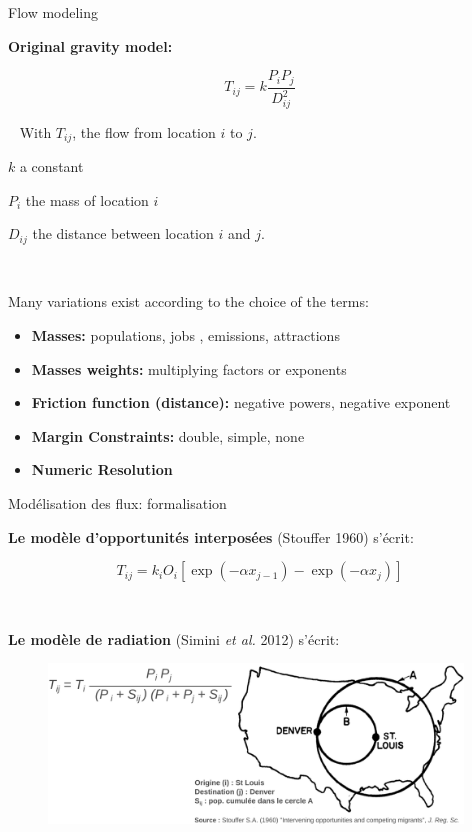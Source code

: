\begin{frame}{Flow modeling}

\textbf{Original gravity model:}

\begin{equation}
\nonumber
T_{ij} = k \frac{P_i P_j}{D_{ij}^{2}}
\end{equation}

~
With $T_{ij}$, the flow from location $i$ to $j$.

$k$ a constant

$P_i$ the mass of location $i$

$D_{ij}$ the distance between location $i$ and $j$.


~

Many variations exist according to the choice of the terms:

\begin{itemize}
  \item \textbf{Masses:} populations, jobs , emissions, attractions
  \item \textbf{Masses weights:} multiplying factors or exponents
  \item \textbf{Friction function (distance):} negative powers, negative exponent
  \item \textbf{Margin Constraints:} double, simple, none
  \item \textbf{Numeric Resolution } 
\end{itemize}


\end{frame}


\begin{frame}{Modélisation des flux: formalisation}

\textbf{Le modèle d'opportunités interposées} (Stouffer 1960) s'écrit:

\begin{equation}
\nonumber
T_{ij} = k_i O_i \left[\exp(-\alpha x_{j-1}) - \exp(-\alpha x_{j}) \right]
\end{equation}

~

\textbf{Le modèle de radiation} (Simini \textit{et al.} 2012) s'écrit:  

\begin{figure}
  \includegraphics[width = 110mm]{CercleStouffer.pdf}
\end{figure}

\end{frame}


